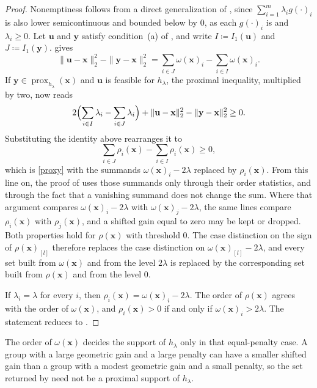 \documentclass[11pt,a4paper]{article}
\theoremstyle{plain}
\theoremstyle{definition}
\theoremstyle{remark}
\newcommand*\x{\mathbf{x}}
\newcommand*\U{\mathbf{u}}
\newcommand*\y{\mathbf{y}}
\newcommand*\prox{\operatorname{prox}}
\begin{document}
\begin{proof}
  Nonemptiness follows from a direct generalization of , since \(\sum_{i=1}^m \lambda_i g(\cdot)_i\) is also lower semicontinuous and bounded below by \(0\), as each \(g(\cdot)_i\) is and \(\lambda_i \geq 0\).
  Let \(\U\) and \(\y\) satisfy condition~(a) of , and write \(I\coloneqq I_1(\U)\) and \(J\coloneqq I_1(\y)\).
   gives
  \[
    \|\U-\x\|_2^2-\|\y-\x\|_2^2=\sum_{i\in J}\omega(\x)_i-\sum_{i\in I}\omega(\x)_i.
  \]
  If \(\y\in\prox_{h_{\lambda}}(\x)\) and \(\U\) is feasible for \(h_{\lambda}\),
  the proximal inequality, multiplied by two, now reads
  \[
    2\Bigl(\sum_{i\in I}\lambda_i-\sum_{i\in J}\lambda_i\Bigr)+\|\U-\x\|_2^2-\|\y-\x\|_2^2\geq 0.
  \]
  Substituting the identity above rearranges it to
  \begin{equation}
    \label{proxy-rho}
    \sum_{i\in J}\rho_i(\x)-\sum_{i\in I}\rho_i(\x)\geq 0,
  \end{equation}
  which is \eqref{proxy} with the summands \(\omega(\x)_i-2\lambda\) replaced by
  \(\rho_i(\x)\).
  From this line on, the proof of  uses those summands only through their order statistics, and through the fact that a vanishing summand does not change the sum.
  Where that argument compares \(\omega(\x)_i-2\lambda\) with \(\omega(\x)_j-2\lambda\), the same lines compare \(\rho_i(\x)\) with \(\rho_j(\x)\), and a shifted gain equal to zero may be kept or dropped.
  Both properties hold for \(\rho(\x)\) with threshold \(0\).
  The case distinction on the sign of \(\rho(\x)_{[l]}\) therefore replaces the case distinction on \(\omega(\x)_{[l]}-2\lambda\), and every set built from \(\omega(\x)\) and from the level \(2\lambda\) is replaced by the corresponding set built from \(\rho(\x)\) and from the level \(0\).

  If \(\lambda_i=\lambda\) for every \(i\), then \(\rho_i(\x)=\omega(\x)_i-2\lambda\).
  The order of \(\rho(\x)\) agrees with the order of \(\omega(\x)\), and \(\rho_i(\x)>0\) if and only if \(\omega(\x)_i>2\lambda\).
  The statement reduces to .
\end{proof}

The order of \(\omega(\x)\) decides the support of \(h_{\lambda}\) only in that equal-penalty case.
A group with a large geometric gain and a large penalty can have a smaller shifted gain than a group with a modest geometric gain and a small penalty, so the set returned by  need not be a proximal support of \(h_{\lambda}\).
\end{document}
